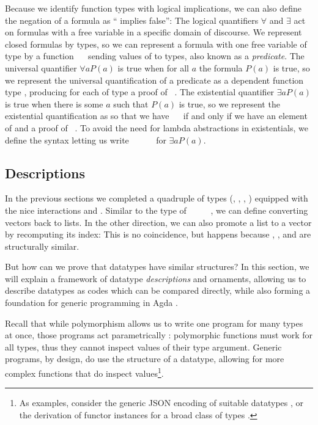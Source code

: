 Because we identify function types with logical implications, we can also define the negation of a formula  as `` implies false'':
The logical quantifiers $\forall$ and $\exists$ act on formulas with a free variable in a specific domain of discourse. We represent closed formulas by types, so we can represent a formula with one free variable of type  by a function \ \  sending values of  to types, also known as a \emph{predicate}. The universal quantifier $\forall a P(a)$ is true when for all $a$ the formula $P(a)$ is true, so we represent the universal quantification of a predicate  as a dependent function type , producing for each  of type  a proof of \ . The existential quantifier $\exists a P(a)$ is true when there is some $a$ such that $P(a)$ is true, so we represent the existential quantification as
so that we have \ \  if and only if we have an element  of  and a proof  of \ . To avoid the need for lambda abstractions in existentials, we define the syntax
letting us write \AD{Σ[}\ \ \ \ \AD{]}\  for $\exists a P(a)$.

\subsection{Descriptions}\label{sec:background-descriptions}
In the previous sections we completed a quadruple of types (\bN{}, , , ) equipped with the nice interactions  and . Similar to the type of \ \AV{:}\ \ \ \ \bN{}, we can define
converting vectors back to lists. In the other direction, we can also promote a list to a vector by recomputing its index:
This is no coincidence, but happens because \bN{}, , and  are structurally similar.

But how can we prove that datatypes have similar structures? In this section, we will explain a framework of datatype \emph{descriptions} and ornaments, allowing us to describe datatypes as codes which can be compared directly, while also forming a foundation for generic programming in Agda \cite{ulftutorial, genericsamm, effectfully, practgen}. 

Recall that while polymorphism allows us to write one program for many types at once, those programs act parametrically \cite{reynolds1983types, wadlerfree}: polymorphic functions must work for all types, thus they cannot inspect values of their type argument. Generic programs, by design, do use the structure of a datatype, allowing for more complex functions that do inspect values\footnote{As examples, consider the generic JSON encoding of suitable datatypes \cite{truesop}, or the derivation of functor instances for a broad class of types \cite{haskellderiving}.}.

